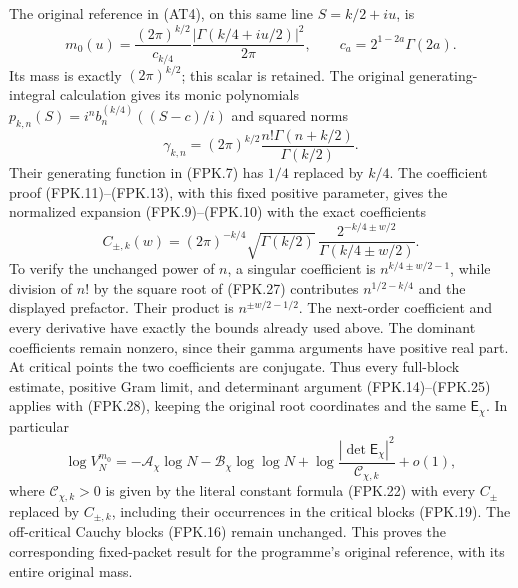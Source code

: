 The original reference in (AT4), on this same line $S=k/2+iu$, is
\[
 m_0(u)=\frac{(2\pi)^{k/2}}{c_{k/4}}
           \frac{|\Gamma(k/4+iu/2)|^2}{2\pi},
 \qquad c_a=2^{1-2a}\Gamma(2a).
 \tag{FPK.26}
\]
Its mass is exactly $(2\pi)^{k/2}$; this scalar is retained.
The original generating-integral calculation gives its monic
polynomials $p_{k,n}(S)=i^n b_n^{(k/4)}((S-c)/i)$ and squared norms
\[
 \gamma_{k,n}=(2\pi)^{k/2}
                  \frac{n!\Gamma(n+k/2)}{\Gamma(k/2)}.
 \tag{FPK.27}
\]
Their generating function in (FPK.7) has $1/4$ replaced by $k/4$.
The coefficient proof (FPK.11)--(FPK.13), with this fixed positive
parameter, gives the normalized expansion (FPK.9)--(FPK.10) with
the exact coefficients
\[
 C_{\pm,k}(w)=
 (2\pi)^{-k/4}\sqrt{\Gamma(k/2)}\,
          \frac{2^{-k/4\pm w/2}}{\Gamma(k/4\pm w/2)}.
 \tag{FPK.28}
\]
To verify the unchanged power of $n$, a singular coefficient is
$n^{k/4\pm w/2-1}$, while division of $n!$ by the square root
of (FPK.27) contributes $n^{1/2-k/4}$ and the displayed prefactor.
Their product is $n^{\pm w/2-1/2}$. The next-order coefficient
and every derivative have exactly the bounds already used above.
The dominant coefficients remain nonzero, since their gamma
arguments have positive real part. At critical points the two
coefficients are conjugate. Thus every full-block estimate,
positive Gram limit, and determinant argument (FPK.14)--(FPK.25)
applies with (FPK.28), keeping the original root coordinates and
the same $\mathsf E_\chi$. In particular
\[
 \log V_N^{m_0}
   =-\mathcal A_\chi\log N-\mathcal B_\chi\log\log N
       +\log\frac{|\det\mathsf E_\chi|^2}{\mathcal C_{\chi,k}}+o(1),
 \tag{FPK.29}
\]
where $\mathcal C_{\chi,k}>0$ is given by the literal constant
formula (FPK.22) with every $C_\pm$ replaced by $C_{\pm,k}$,
including their occurrences in the critical blocks (FPK.19).
The off-critical Cauchy blocks (FPK.16) remain unchanged.
This proves the corresponding fixed-packet result for the
programme's original reference, with its entire original mass.

